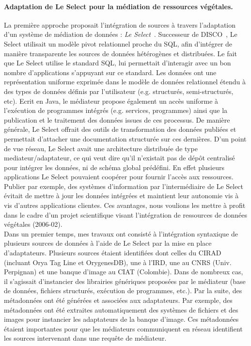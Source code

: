 \paragraph*{Adaptation de Le Select pour la médiation de ressources végétales.} La première approche proposait l'intégration de sources à travers l'adaptation d'un système de médiation de données : \textit{Le Select}~\cite{manolescu2002}. Successeur de DISCO~\cite{Tomasic1998}, Le Select utilisait un modèle pivot relationnel proche du SQL, afin d’intégrer de manière transparente les sources de données hétérogènes et distribuées. Le fait que Le Select utilise le standard SQL, lui permettait d’interagir avec un bon nombre d’applications s’appuyant sur ce standard.
Les données ont une représentation uniforme exprimée dans le modèle de données relationnel étendu à des types de données définis par l'utilisateur (e.g. structurés, semi-structurés, etc). Ecrit en Java, le médiateur propose également un accès uniforme à l’exécution de programmes intégrés (e.g. services, programmes) ainsi que la publication et le traitement des données issues de ces processus. De manière générale, Le Select offrait des outils de transformation des données publiées et permettait d’attacher une documentation structurée sur ces dernières. D’un point de vue réseau, Le Select avait une architecture distribuée de type mediateur/adaptateur, ce qui veut dire qu’il n’existait pas de dépôt centralisé pour intégrer les données, ni de schéma global prédéfini. En effet plusieurs applications Le Select pouvaient coopérer pour fournir l’accès aux ressources. Publier par exemple, des systèmes d’information par l’intermédiaire de Le Select évitait de mettre à jour les données intégrées et maintient leur autonomie vis à vis d’autres applications clientes. Ces avantages, nous voulions les mettre à profit dans le cadre d’un projet scientifique visant l’intégration de ressources de données végétales (2006-02).\\

Dans un premier temps, mes travaux ont consisté à l'intégration syntaxique de plusieurs sources de données à l'aide de Le Select par la mise en place d'adaptateurs. Plusieurs sources étaient identifiées dont celles du CIRAD (incluant Orya Tag Line et OrygenesDB), une à l'IRD, une au CNRS (Univ. Perpignan) et une banque d'image au CIAT (Colombie). Dans de nombreux cas, il s'agissait d'instancier des librairies génériques proposées par le médiateur (base de données, fichiers structurés, exécution de programmes, etc.). Par la suite, des métadonnées ont été générées et associées aux adaptateurs. Par exemple, des métadonnées ont été extraites automatiquement des systèmes de fichiers et des images pour instancier les adaptateurs de la banque d'image. Ces métadonnées étaient importantes pour que les médiateurs communiquent en réseau identifient les sources intervenant dans une requête de médiateur.

